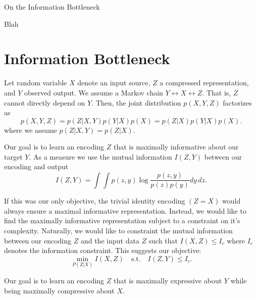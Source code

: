 \documentclass[11pt]{article}
\begin{document}
\begin{center}
{\LARGE On the Information Bottleneck} 
\end{center}

Blah

\section{Information Bottleneck}

Let random variable $X$ denote an input source, $Z$ a compressed representation, and $Y$ observed output. We assume a Markov chain $Y \leftrightarrow X \leftrightarrow Z$. That is, $Z$ cannot directly depend on $Y$. Then, the joint distribution $p(X,Y,Z)$ factorizes as
\begin{equation}
p(X, Y, Z) = p(Z\vert X,Y)p(Y\vert X)p(X) = p(Z\vert X)p(Y\vert X)p(X).
\end{equation}
where we assume $p(Z\vert X,Y) = p(Z\vert X)$.

Our goal is to learn an encoding $Z$ that is maximally informative about our target $Y$. As a measure we use the mutual information $I(Z,Y)$ between our encoding and output
\begin{equation}
I(Z,Y) = \int \int p(z,y) \log \frac{p(z,y)}{p(z)p(y)} dy\, dz.
\end{equation}

If this was our only objective, the trivial identity encoding $(Z = X)$ would always ensure a maximal informative representation. Instead, we would like to find the maximally informative representation subject to a constraint on it's complexity. Naturally, we would like to constraint the mutual information between our encoding $Z$ and the input data $Z$ such that $I(X,Z) \leq I_c$ where $I_c$ denotes the information constraint. This suggests our objective:
\begin{equation}
\underset{P(Z\vert X)}{\min} I(X,Z) \quad\text{s.t.}\quad I(Z,Y) \leq I_c.
\end{equation}


Our goal is to learn an encoding $Z$ that is maximally expressive about $Y$ while being maximally compressive about $X$. 




 
\end{document}
